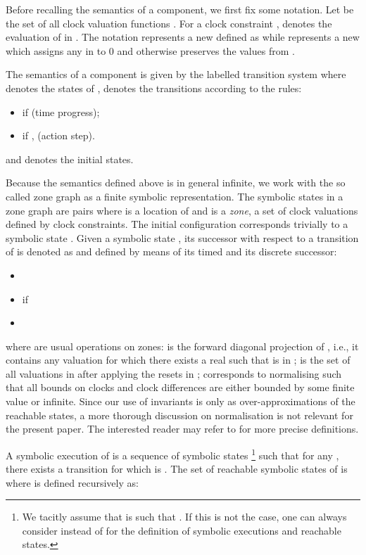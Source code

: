 \documentclass{LMCS}
\theoremstyle{plain}\newtheorem{remark}[thm]{Remark}
\theoremstyle{plain}\newtheorem{example}[thm]{Example}
\begin{document}
Before recalling the semantics of a component, we first fix some notation.
Let  be the set of all clock valuation functions .  For a clock constraint , 
denotes the evaluation of  in . The notation 
represents a new  defined as  while  represents a new  which assigns any 
in  to 0 and otherwise preserves the values from .

\begin{defi}[Semantics]The semantics of a component  is given by
  the labelled transition system  where  denotes the states of ,
   denotes the transitions according to the rules:
    \begin{itemize}
    \item  if  (time progress);
    \item  if ,  (action step).
    \end{itemize}
    and  denotes the initial states. 
\end{defi}

Because the semantics defined above is in general infinite, we work with
the so called zone graph \cite{henzinger94} as a finite symbolic
representation. The symbolic states in a zone graph are pairs 
where  is a location of  and  is a \textit{zone}, a set of
clock valuations defined by clock constraints.  The initial configuration
 corresponds trivially to a symbolic state .
Given a symbolic state , its successor with respect to a
transition  of  is denoted as  and defined by
means of its timed and its discrete successor:
\begin{itemize}
\item 
\item  if 
\item 
\end{itemize}
where  are usual operations on zones:  is the forward diagonal projection of , i.e., it
contains any valuation  for which there exists a real
 such that  is in ;  is
the set of all valuations in  after applying the resets in ;
 corresponds to normalising  such that all
bounds on clocks and clock differences are either bounded by some
finite value or infinite. Since our use of invariants is only as
over-approximations of the reachable states, a more thorough
discussion on normalisation is not relevant for the present paper. The
interested reader may refer to \cite{bengtssonY03,bouyer04} for more
precise definitions.

A symbolic execution of  is a sequence of
symbolic states \footnote{We tacitly assume that
   is such that .  If this is not the case, one can
  always consider  instead of  for the definition of symbolic
  executions and reachable states.} such that for any , there exists
a transition  for which  is . The set of
reachable symbolic states of  is 
where  is defined recursively as:
\end{document}
